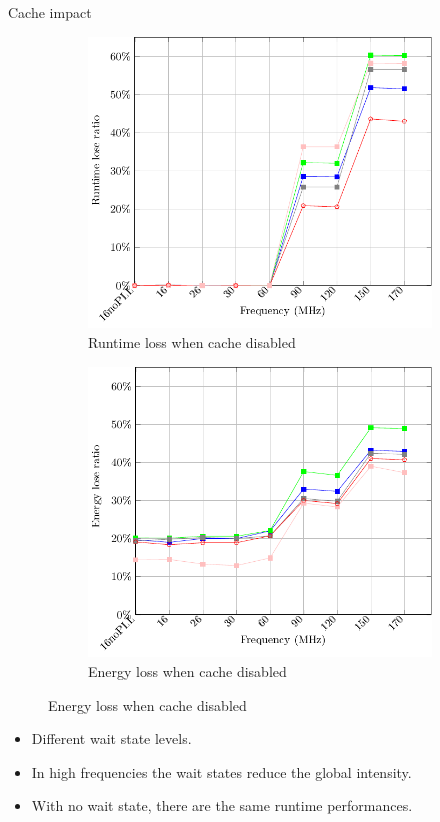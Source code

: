 \documentclass[
	11pt, %
]{beamer}
\begin{document}
\begin{frame}{Cache impact}
	\begin{figure}
		\begin{subfigure}{0.4\textwidth}
			\includegraphics[scale = 0.35]{data/stm32g_v2/cache_impact/duration.pdf}
			\caption{Runtime loss when cache disabled}
		\end{subfigure}
		\begin{subfigure}{0.4\textwidth}
			\includegraphics[scale = 0.35]{data/stm32g_v2/cache_impact/energy.pdf}
			\caption{Energy loss when cache disabled}
		\end{subfigure}
	\end{figure}
	\begin{itemize}
		\item Different wait state levels.
		\item In high frequencies the wait states reduce the global intensity.
		\item With no wait state, there are the same runtime performances.
	\end{itemize}
\end{frame}
\end{document}
